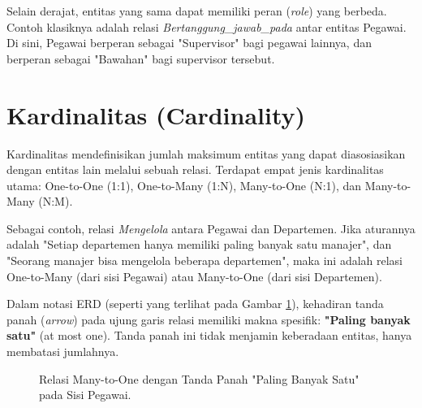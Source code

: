 \documentclass[11pt,a4paper]{article}
\begin{document}
Selain derajat, entitas yang sama dapat memiliki peran (\textit{role}) yang berbeda. Contoh klasiknya adalah relasi \textit{Bertanggung\_jawab\_pada} antar entitas Pegawai. Di sini, Pegawai berperan sebagai "Supervisor" bagi pegawai lainnya, dan berperan sebagai "Bawahan" bagi supervisor tersebut.

\section{Kardinalitas (Cardinality)}

Kardinalitas mendefinisikan jumlah maksimum entitas yang dapat diasosiasikan dengan entitas lain melalui sebuah relasi. Terdapat empat jenis kardinalitas utama: One-to-One (1:1), One-to-Many (1:N), Many-to-One (N:1), dan Many-to-Many (N:M).

Sebagai contoh, relasi \textit{Mengelola} antara Pegawai dan Departemen. Jika aturannya adalah "Setiap departemen hanya memiliki paling banyak satu manajer", dan "Seorang manajer bisa mengelola beberapa departemen", maka ini adalah relasi One-to-Many (dari sisi Pegawai) atau Many-to-One (dari sisi Departemen).

Dalam notasi ERD (seperti yang terlihat pada Gambar \ref{fig:cardinality}), kehadiran tanda panah (\textit{arrow}) pada ujung garis relasi memiliki makna spesifik: \textbf{"Paling banyak satu"} (at most one). Tanda panah ini tidak menjamin keberadaan entitas, hanya membatasi jumlahnya.

\begin{figure}[H]
	\centering
	\caption{Relasi Many-to-One dengan Tanda Panah "Paling Banyak Satu" pada Sisi Pegawai.}
	\label{fig:cardinality}
\end{figure}
\end{document}
